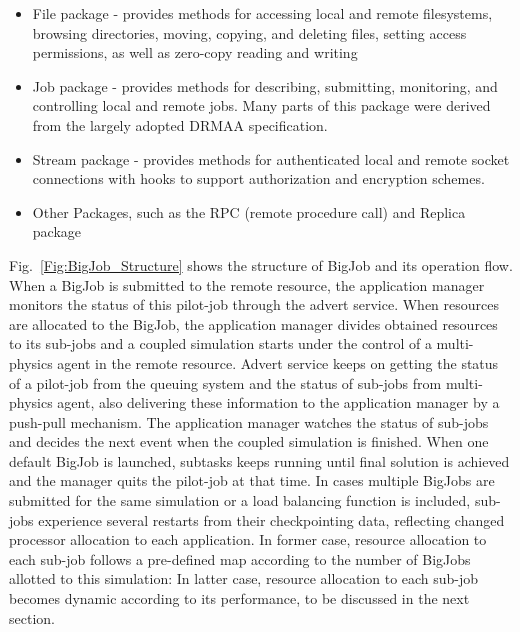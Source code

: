 \documentclass[conference,final]{IEEEtran}
\newcommand{\skonote}[1]{ {\textcolor{blue} { ***Jeff: #1 }}}
\newcommand{\skonote}[1]{}
\begin{document}


\begin{itemize}
\item File package - provides methods for accessing local and remote
 filesystems, browsing directories, moving, copying, and deleting
 files, setting access permissions, as well as zero-copy reading and
 writing
\item Job package - provides methods for describing, submitting,
 monitoring, and controlling local and remote jobs. Many parts of
 this package were derived from the largely adopted
 DRMAA %
 specification.
\item Stream package - provides methods for authenticated local and
 remote socket connections with hooks to support authorization and
 encryption schemes.
\item Other Packages, such as the RPC (remote procedure call) and Replica
 package
\end{itemize}







Fig.~\ref{Fig:BigJob_Structure} shows the structure of BigJob and its operation flow. When a BigJob is submitted to the remote resource, the application manager monitors the status of this pilot-job through the advert service. When resources are allocated to the BigJob, the application manager divides obtained resources to its sub-jobs and a coupled simulation starts under the control of a multi-physics agent in the remote resource. Advert service keeps on getting the status of a pilot-job from the queuing system and the status of sub-jobs from multi-physics agent, also delivering these information to the application manager by a push-pull mechanism. The application manager watches the status of sub-jobs and decides the next event when the coupled simulation is finished. When one default BigJob is launched, subtasks keeps running until final solution is achieved and the manager quits the pilot-job at that time. In cases multiple BigJobs are submitted for the same simulation or a load balancing function is included, sub-jobs experience several restarts from their checkpointing data, reflecting changed processor allocation to each application. In former case, resource allocation to each sub-job follows a pre-defined map according to the number of BigJobs allotted to this simulation: In latter case, resource allocation to each sub-job becomes dynamic according to its performance, to be discussed in the next section.
\end{document}
